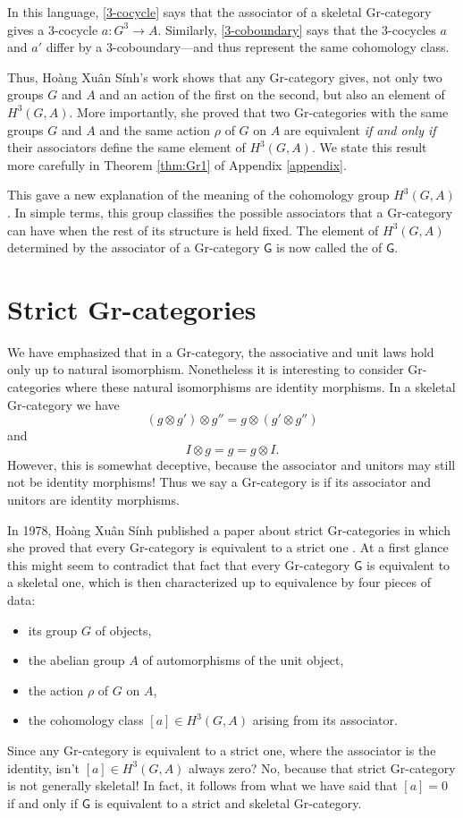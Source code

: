 \documentclass[reqno]{amsart}
\newcommand{\maps}{\colon}    %
\newcommand{\G}{{\mathsf{G}}}   %
\newcommand{\define}[1]{\textbf{\boldmath{#1}}}
\theoremstyle{definition}
\begin{document}
In this language, \eqref{3-cocycle} says that the associator of a skeletal Gr-category gives a 3-cocycle $a \maps G^3 \to A$.   Similarly, \eqref{3-coboundary} says that the 3-cocycles $a$ and $a'$ differ by a 3-coboundary---and thus represent the same cohomology class.  

Thus, Ho\`ang Xu\^an S\'inh's work shows that any Gr-category gives, not only two groups $G$ and $A$ and an action of the first on the second, but also an element of $H^3(G,A)$. More importantly, she proved that two Gr-categories with the same groups $G$ and $A$ and the same action $\rho$ of $G$ on $A$ are equivalent \emph{if and only if} their associators define the same element of $H^3(G,A)$.  We state this result more carefully in Theorem \ref{thm:Gr1} of Appendix \ref{appendix}. 

This gave a new explanation of the meaning of the cohomology group $H^3(G,A)$.  In simple terms, this group classifies the possible associators that a Gr-category can have when the rest of its structure is held fixed.  The element of $H^3(G,A)$ determined by the associator of a Gr-category $\G$ is now called the \define{S\'inh invariant} of $\G$.

\section{Strict Gr-categories}
\label{sec:strict_Gr}

We have emphasized that in a Gr-category, the associative and unit laws hold only up to natural isomorphism.   Nonetheless it is interesting to consider Gr-categories where these natural isomorphisms are identity morphisms.   In a skeletal Gr-category we have
\[    (g \otimes g') \otimes g'' = g \otimes (g' \otimes g'') \]
and
\[      I \otimes g = g = g \otimes I.  \]
However, this is somewhat deceptive, because the associator and unitors may still not be identity morphisms!   Thus we say a Gr-category is \define{strict} if its associator and unitors are identity morphisms.   

In 1978, Ho\`ang Xu\^an S\'inh published a paper about strict Gr-categories in which she proved that every Gr-category is equivalent to a strict one \cite{H78}.  At a first glance this might seem to contradict that fact that every Gr-category $\G$ is equivalent to a skeletal one, which is then characterized up to equivalence by four pieces of data:
\begin{itemize}
\item its group $G$ of objects,
\item the abelian group $A$ of automorphisms of the unit object,
\item the action $\rho$ of $G$ on $A$,
\item the cohomology class $[a] \in H^3(G,A)$ arising from its associator.
\end{itemize}
Since any Gr-category is equivalent to a strict one, where the associator is the identity, isn't $[a] \in H^3(G,A)$ always zero?  No, because that strict Gr-category is not generally skeletal!   In fact, it follows from what we have said that $[a] = 0$ if and only if $\G$ is equivalent to a strict and skeletal Gr-category.  
\end{document}
